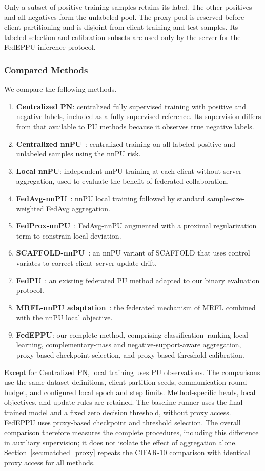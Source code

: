 \documentclass[lettersize,journal]{IEEEtran}
\begin{document}
Only a subset of positive training samples retains its label. The other positives and all negatives form the unlabeled pool. The proxy pool is reserved before client partitioning and is disjoint from client training and test samples. Its labeled selection and calibration subsets are used only by the server for the FedEPPU inference protocol.

\subsubsection{Compared Methods}
We compare the following methods.
\begin{enumerate}
    \item \textbf{Centralized PN}: centralized fully supervised training with positive and negative labels, included as a fully supervised reference. Its supervision differs from that available to PU methods because it observes true negative labels.
    \item \textbf{Centralized nnPU}~\cite{ref_nnpu}: centralized training on all labeled positive and unlabeled samples using the nnPU risk.
    \item \textbf{Local nnPU}: independent nnPU training at each client without server aggregation, used to evaluate the benefit of federated collaboration.
    \item \textbf{FedAvg-nnPU}~\cite{ref_fedavg}: nnPU local training followed by standard sample-size-weighted FedAvg aggregation.
    \item \textbf{FedProx-nnPU}~\cite{ref_fedprox}: FedAvg-nnPU augmented with a proximal regularization term to constrain local deviation.
    \item \textbf{SCAFFOLD-nnPU}~\cite{ref_scaffold}: an nnPU variant of SCAFFOLD that uses control variates to correct client--server update drift.
    \item \textbf{FedPU}~\cite{ref_fedpu}: an existing federated PU method adapted to our binary evaluation protocol.
    \item \textbf{MRFL-nnPU adaptation}~\cite{ref_mrfl}: the federated mechanism of MRFL combined with the nnPU local objective.
    \item \textbf{FedEPPU}: our complete method, comprising classification--ranking local learning, complementary-mass and negative-support-aware aggregation, proxy-based checkpoint selection, and proxy-based threshold calibration.
\end{enumerate}

Except for Centralized PN, local training uses PU observations. The comparisons use the same dataset definitions, client-partition seeds, communication-round budget, and configured local epoch and step limits. Method-specific heads, local objectives, and update rules are retained. The baseline runner uses the final trained model and a fixed zero decision threshold, without proxy access. FedEPPU uses proxy-based checkpoint and threshold selection. The overall comparison therefore measures the complete procedures, including this difference in auxiliary supervision; it does not isolate the effect of aggregation alone. Section~\ref{sec:matched_proxy} repeats the CIFAR-10 comparison with identical proxy access for all methods.
\end{document}
